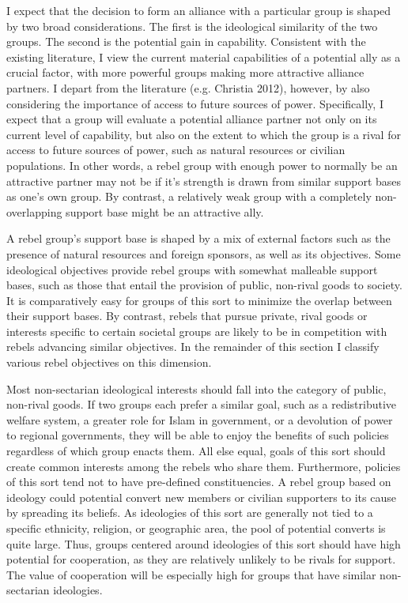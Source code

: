 \documentclass[12pt,]{article}
\begin{document}
I expect that the decision to form an alliance with a particular group
is shaped by two broad considerations. The first is the ideological
similarity of the two groups. The second is the potential gain in
capability. Consistent with the existing literature, I view the current
material capabilities of a potential ally as a crucial factor, with more
powerful groups making more attractive alliance partners. I depart from
the literature (e.g. Christia 2012), however, by also considering the
importance of access to future sources of power. Specifically, I expect
that a group will evaluate a potential alliance partner not only on its
current level of capability, but also on the extent to which the group
is a rival for access to future sources of power, such as natural
resources or civilian populations. In other words, a rebel group with
enough power to normally be an attractive partner may not be if it's
strength is drawn from similar support bases as one's own group. By
contrast, a relatively weak group with a completely non-overlapping
support base might be an attractive ally.

A rebel group's support base is shaped by a mix of external factors such
as the presence of natural resources and foreign sponsors, as well as
its objectives. Some ideological objectives provide rebel groups with
somewhat malleable support bases, such as those that entail the
provision of public, non-rival goods to society. It is comparatively
easy for groups of this sort to minimize the overlap between their
support bases. By contrast, rebels that pursue private, rival goods or
interests specific to certain societal groups are likely to be in
competition with rebels advancing similar objectives. In the remainder
of this section I classify various rebel objectives on this dimension.

Most non-sectarian ideological interests should fall into the category
of public, non-rival goods. If two groups each prefer a similar goal,
such as a redistributive welfare system, a greater role for Islam in
government, or a devolution of power to regional governments, they will
be able to enjoy the benefits of such policies regardless of which group
enacts them. All else equal, goals of this sort should create common
interests among the rebels who share them. Furthermore, policies of this
sort tend not to have pre-defined constituencies. A rebel group based on
ideology could potential convert new members or civilian supporters to
its cause by spreading its beliefs. As ideologies of this sort are
generally not tied to a specific ethnicity, religion, or geographic
area, the pool of potential converts is quite large. Thus, groups
centered around ideologies of this sort should have high potential for
cooperation, as they are relatively unlikely to be rivals for support.
The value of cooperation will be especially high for groups that have
similar non-sectarian ideologies.
\end{document}
